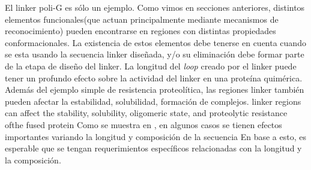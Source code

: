 El linker poli-G es sólo un ejemplo. 
Como vimos en secciones anteriores, distintos elementos funcionales(que actuan principalmente mediante mecanismos de reconocimiento) pueden encontrarse en regiones con distintas propiedades conformacionales. 
La existencia de estos elementos debe tenerse en cuenta cuando se esta usando la secuencia linker diseñada, y/o su eliminación debe formar parte de la etapa de diseño del linker.
La longitud del \textit{loop} creado por el linker puede tener un profundo efecto sobre la actividad del linker en una proteína quimérica\cite{nagi1997inverse}.
Además del ejemplo simple de resistencia proteolítica, las regiones linker también pueden afectar la estabilidad, solubilidad, formación de complejos.
linker regions can affect the stability, solubility, oligomeric state, and proteolytic resistance ofthe fused protein
Como se muestra en \cite{robinson1998optimizing}, en algunos casos se tienen efectos importantes variando la longitud y composición de la secuencia
En base a esto, es esperable que se tengan requerimientos específicos relacionadas con la longitud y la composición. 



